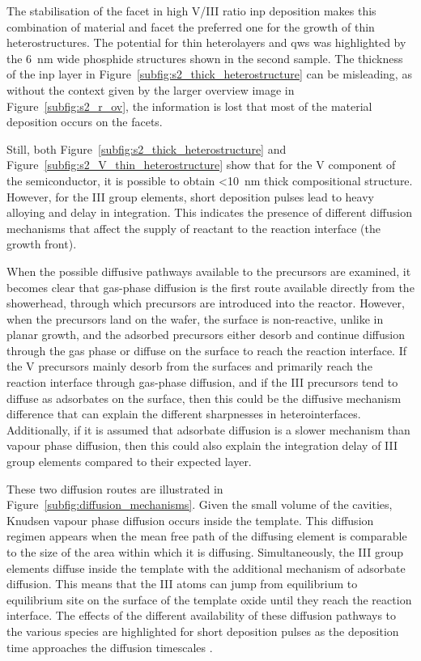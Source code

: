 The stabilisation of the  facet in high V/III ratio \acs{inp} deposition makes this combination of material and facet the preferred one for the growth of thin heterostructures. The potential for thin heterolayers and \acl{qw}s was highlighted by the \qty{6}{\nano\metre} wide phosphide structures shown in the second sample. The thickness of the \acs{inp} layer in Figure~\ref{subfig:s2_thick_heterostructure} can be misleading, as without the context given by the larger overview image in Figure~\ref{subfig:s2_r_ov}, the information is lost that most of the material deposition occurs on the  facets. 

Still, both Figure~\ref{subfig:s2_thick_heterostructure} and Figure~\ref{subfig:s2_V_thin_heterostructure} show that for the V component of the semiconductor, it is possible to obtain <\qty{10}{\nano\metre} thick compositional structure. However, for the III group elements, short deposition pulses lead to heavy alloying and delay in integration. This indicates the presence of different diffusion mechanisms that affect the supply of reactant to the reaction interface (the growth front). 

When the possible diffusive pathways available to the precursors are examined, it becomes clear that gas-phase diffusion is the first route available directly from the showerhead, through which precursors are introduced into the reactor. However, when the precursors land on the wafer, the surface is non-reactive, unlike in planar growth, and the adsorbed precursors either desorb and continue diffusion through the gas phase or diffuse on the surface to reach the reaction interface. If the V precursors mainly desorb from the surfaces and primarily reach the reaction interface through gas-phase diffusion, and if the III precursors tend to diffuse as adsorbates on the surface, then this could be the diffusive mechanism difference that can explain the different sharpnesses in heterointerfaces. Additionally, if it is assumed that adsorbate diffusion is a slower mechanism than vapour phase diffusion, then this could also explain the integration delay of III group elements compared to their expected layer. 

These two diffusion routes are illustrated in Figure~\ref{subfig:diffusion_mechanisms}. Given the small volume of the cavities, Knudsen vapour phase diffusion occurs inside the template. This diffusion regimen appears when the mean free path of the diffusing element is comparable to the size of the area within which it is diffusing. Simultaneously, the III group elements diffuse inside the template with the additional mechanism of adsorbate diffusion. This means that the III atoms can jump from equilibrium to equilibrium site on the surface of the template oxide until they reach the reaction interface. The effects of the different availability of these diffusion pathways to the various species are highlighted for short deposition pulses as the deposition time approaches the diffusion timescales \cite{Brugnolotto2023}.

